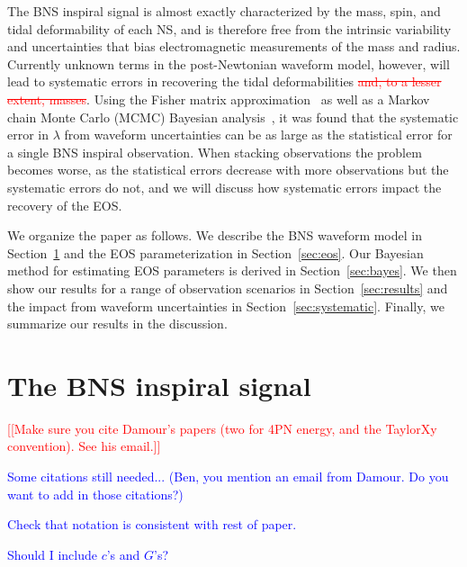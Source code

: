 \documentclass[twocolumn,prd,amssymb,aps,nofootinbib,showpacs,epsf]{revtex4}
\newcommand{\red}{\textcolor{red}}
\newcommand\ben[2]{\textcolor{red}{{#1}\sout{#2}}}
\newcommand\les[2]{\textcolor{blue}{{#1}\sout{#2}}}
\begin{document}
The BNS inspiral signal is almost exactly characterized by the mass, spin, and tidal deformability of each NS, and is therefore free from the intrinsic variability and uncertainties that bias electromagnetic measurements of the mass and radius. Currently unknown terms in the post-Newtonian waveform model, however, will lead to systematic errors in recovering the tidal deformabilities \ben{}{and, to a lesser extent, masses}. Using the Fisher matrix approximation~\cite{Favata2014, YagiYunes2014} as well as a Markov chain Monte Carlo (MCMC) Bayesian analysis~\cite{WadeCreightonOchsner2014}, it was found that the systematic error in $\lambda$ from waveform uncertainties can be as large as the statistical error for a single BNS inspiral observation. When stacking observations the problem becomes worse, as the statistical errors decrease with more observations but the systematic errors do not, and we will discuss how systematic errors impact the recovery of the EOS.

We organize the paper as follows. We describe the BNS waveform model in Section~\ref{sec:waveform} and the EOS parameterization in Section~\ref{sec:eos}. Our Bayesian method for estimating EOS parameters is derived in Section~\ref{sec:bayes}. We then show our results for a range of observation scenarios in Section~\ref{sec:results} and the impact from waveform uncertainties in Section~\ref{sec:systematic}. Finally, we summarize our results in the discussion.


\section{The BNS inspiral signal}
\label{sec:waveform}

\red{[[Make sure you cite Damour's papers (two for 4PN energy, and the TaylorXy convention). See his email.]]}

\les{Some citations still needed...  (Ben, you mention an email from Damour.  Do you want to add in those citations?)}{}

\les{Check that notation is consistent with rest of paper.}{}

\les{Should I include $c$'s and $G$'s?}{}
\end{document}
